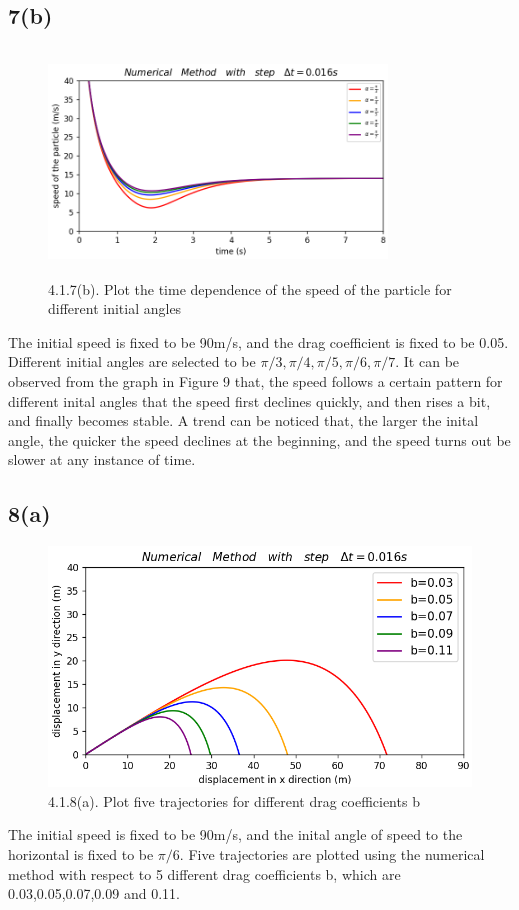 \documentclass{article}
\begin{document}
\subsection*{7(b)}
\begin{figure}[H]
  \centering
  \includegraphics[width=9cm,height=6cm]{./graphs/project4.1.7(b).png}
  \caption{4.1.7(b). Plot the time dependence of the speed of the particle for different initial angles}
\end{figure}
The initial speed is fixed to be 90m/s, and the drag coefficient is fixed to be 0.05.
Different initial angles are selected to be {$\pi/3,\pi/4,\pi/5,\pi/6,\pi/7$}.
It can be observed from the graph in Figure 9 that, the speed follows a certain pattern for different inital angles that the speed first declines quickly, and then rises a bit, and finally becomes stable.
A trend can be noticed that, the larger the inital angle, the quicker the speed declines at the beginning, and the speed turns out be slower at any instance of time.

\vspace{0.01\textheight}
\subsection*{8(a)}
\begin{figure}[H]
  \centering
  \includegraphics[scale=0.6]{./graphs/project4.1.8(a).png}
  \caption{4.1.8(a). Plot five trajectories for different drag coefficients b}
\end{figure}
The initial speed is fixed to be 90m/s, and the inital angle of speed to the horizontal is fixed to be {$\pi/6$}.
Five trajectories are plotted using the numerical method with respect to 5 different drag coefficients b, which are 0.03,0.05,0.07,0.09 and 0.11.
\end{document}
